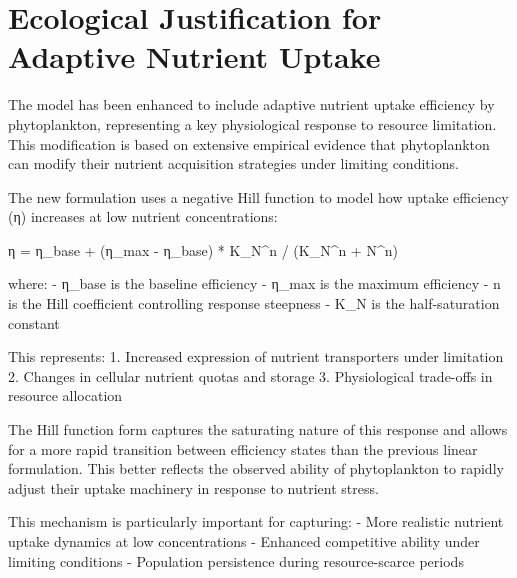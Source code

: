 \section{Ecological Justification for Adaptive Nutrient Uptake}

The model has been enhanced to include adaptive nutrient uptake efficiency by phytoplankton, representing a key physiological response to resource limitation. This modification is based on extensive empirical evidence that phytoplankton can modify their nutrient acquisition strategies under limiting conditions.

The new formulation uses a negative Hill function to model how uptake efficiency (η) increases at low nutrient concentrations:

η = η_base + (η_max - η_base) * K_N^n / (K_N^n + N^n)

where:
- η_base is the baseline efficiency
- η_max is the maximum efficiency
- n is the Hill coefficient controlling response steepness
- K_N is the half-saturation constant

This represents:
1. Increased expression of nutrient transporters under limitation
2. Changes in cellular nutrient quotas and storage
3. Physiological trade-offs in resource allocation

The Hill function form captures the saturating nature of this response and allows for a more rapid transition between efficiency states than the previous linear formulation. This better reflects the observed ability of phytoplankton to rapidly adjust their uptake machinery in response to nutrient stress.

This mechanism is particularly important for capturing:
- More realistic nutrient uptake dynamics at low concentrations
- Enhanced competitive ability under limiting conditions
- Population persistence during resource-scarce periods
